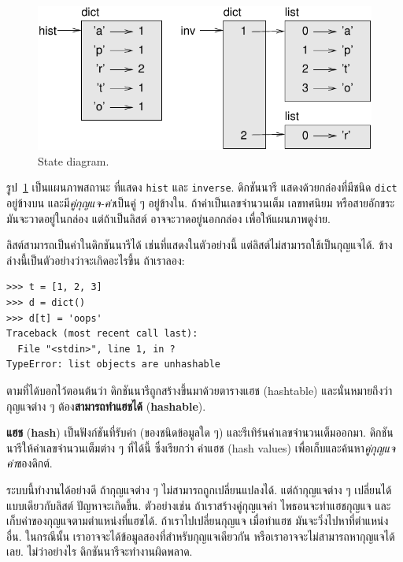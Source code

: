 \begin{figure}
\centerline
{\includegraphics[scale=0.8]{figs/dict1.pdf}}
\caption{State diagram.}
\label{fig.dict1}
\end{figure}

รูป~\ref{fig.dict1} เป็นแผนภาพสถานะ ที่แสดง \texttt{hist} และ \texttt{inverse}.
%
ดิกชันนารี แสดงด้วยกล่องที่มีชนิด \texttt{dict} อยู่ข้างบน
และมี\textit{คู่กุญแจ-ค่า}เป็นคู่ ๆ อยู่ข้างใน.
ถ้าค่าเป็นเลขจำนวนเต็ม เลขทศนิยม หรือสายอักขระ มันจะวาดอยู่ในกล่อง
แต่ถ้าเป็นลิสต์ อาจจะวาดอยู่นอกกล่อง เพื่อให้แผนภาพดูง่าย.

ลิสต์สามารถเป็นค่าในดิกชันนารีได้ เช่นที่แสดงในตัวอย่างนี้
แต่ลิสต์ไม่สามารถใช้เป็นกุญแจได้.
ข้างล่างนี้เป็นตัวอย่างว่าจะเกิดอะไรขึ้น ถ้าเราลอง:


\begin{verbatim}
>>> t = [1, 2, 3]
>>> d = dict()
>>> d[t] = 'oops'
Traceback (most recent call last):
  File "<stdin>", line 1, in ?
TypeError: list objects are unhashable
\end{verbatim}
%
ตามที่ได้บอกไว้ตอนต้นว่า ดิกชันนารีถูกสร้างขึ้นมาด้วยตารางแฮช (hashtable)
และนั่นหมายถึงว่า กุญแจต่าง ๆ ต้อง\textbf{สามารถทำแฮชได้} (\textbf{hashable}).

\textbf{แฮช} (\textbf{hash}) เป็นฟังก์ชันที่รับค่า (ของชนิดข้อมูลใด ๆ) และรีเทิร์นค่าเลขจำนวนเต็มออกมา.
ดิกชันนารีให้ค่าเลขจำนวนเต็มต่าง ๆ ที่ได้นี้ ซึ่งเรียกว่า ค่าแฮช (hash values)
เพื่อเก็บและค้นหา\textit{คู่กุญแจค่า}ของดิกต์.

ระบบนี้ทำงานได้อย่างดี ถ้ากุญแจต่าง ๆ ไม่สามารถถูกเปลี่ยนแปลงได้.
แต่ถ้ากุญแจต่าง ๆ เปลี่ยนได้ แบบเดียวกับลิสต์ ปัญหาจะเกิดขึ้น.
ตัวอย่างเช่น ถ้าเราสร้างคู่กุญแจค่า
ไพธอนจะทำแฮชกุญแจ และเก็บค่าของกุญแจตามตำแหน่งที่แฮชได้.
ถ้าเราไปเปลี่ยนกุญแจ เมื่อทำแฮช มันจะวิ่งไปหาที่ตำแหน่งอื่น.
ในกรณีนั้น เราอาจจะได้ข้อมูลสองที่สำหรับกุญแจเดียวกัน
หรือเราอาจจะไม่สามารถหากุญแจได้เลย.
ไม่ว่าอย่างไร ดิกชันนารีจะทำงานผิดพลาด.

